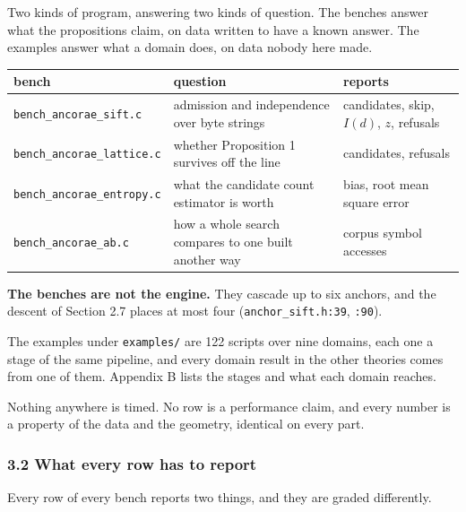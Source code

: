 Two kinds of program, answering two kinds of question. The benches answer what the propositions
claim, on data written to have a known answer. The examples answer what a domain does, on data
nobody here made.

\begin{center}
\begin{tabular}{@{}>{\raggedright\arraybackslash}p{}>{\raggedright\arraybackslash}p{}>{\raggedright\arraybackslash}p{}@{}}
\toprule
bench & question & reports \\
\midrule
\texttt{bench\_ancorae\_sift.c} &
  admission and independence over byte strings &
  candidates, skip, \(I(d)\), \(z\), refusals \\
\addlinespace[0.4em]
\texttt{bench\_\allowbreak{}ancorae\_\allowbreak{}lattice.\allowbreak{}c} &
  whether Proposition 1 survives off the line &
  candidates, refusals \\
\addlinespace[0.4em]
\texttt{bench\_\allowbreak{}ancorae\_\allowbreak{}entropy.\allowbreak{}c} &
  what the candidate count estimator is worth &
  bias, root mean square error \\
\addlinespace[0.4em]
\texttt{bench\_ancorae\_ab.c} &
  how a whole search compares to one built another way &
  corpus symbol accesses \\
\bottomrule
\end{tabular}
\end{center}

\noindent\textbf{The benches are not the engine.} They cascade up to six anchors, and the descent of Section 2.7 places at most four (\texttt{anchor\_sift.h:39}, \texttt{:90}).

The examples under \texttt{examples/\allowbreak{}} are 122 scripts over nine domains, each one a stage of the same pipeline, and every domain result in the other theories comes from one of them. Appendix B lists the stages and what each domain reaches.

Nothing anywhere is timed. No row is a performance claim, and every number is a property of the
data and the geometry, identical on every part.

\subsubsection{3.2 What every row has to report}

Every row of every bench reports two things, and they are graded differently.

